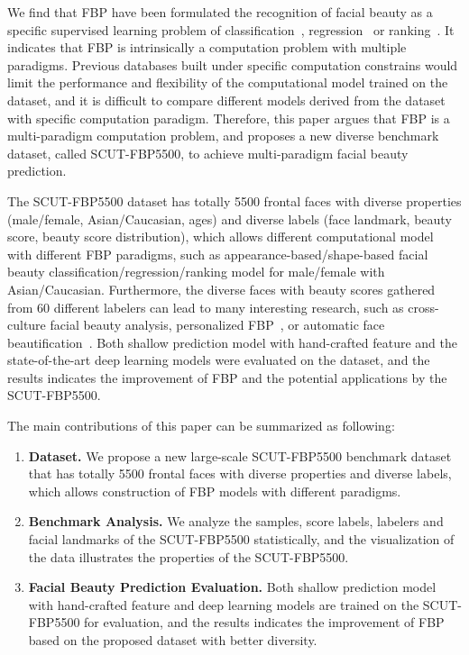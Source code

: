 \documentclass[10pt,conference,a4paper]{IEEEtran}
\begin{document}
We find that FBP have been formulated the recognition of facial beauty as a specific supervised learning problem of classification~\cite{2014chiang,2009mao,2006nc_Dror,2014wang}, regression~\cite{2006Kagian,2012nc_mu,2012fan,2014gan,16} or ranking~\cite{2014yan,2013wacv,liu2016dis}. It indicates that FBP is intrinsically a computation problem with multiple paradigms. Previous databases built under specific computation constrains would limit the performance and flexibility of the computational model trained on the dataset, and it is difficult to compare different models derived from the dataset with specific computation paradigm. Therefore, this paper argues that FBP is a multi-paradigm computation problem, and proposes a new diverse benchmark dataset, called SCUT-FBP5500, to achieve multi-paradigm facial beauty prediction.

The SCUT-FBP5500 dataset has totally 5500 frontal faces with diverse properties (male/female, Asian/Caucasian, ages) and diverse labels (face landmark, beauty score, beauty score distribution), which allows different computational model with different FBP paradigms, such as appearance-based/shape-based facial beauty classification/regression/ranking model for male/female with Asian/Caucasian. Furthermore, the diverse faces with beauty scores gathered from 60 different labelers can lead to many interesting research, such as cross-culture facial beauty analysis, personalized FBP~\cite{19}, or automatic face beautification~\cite{2017liang,2015deep,2014liang,2008sig}. Both shallow prediction model with hand-crafted feature and the state-of-the-art deep learning models were evaluated on the dataset, and the results indicates the improvement of FBP and the potential applications by the SCUT-FBP5500.

The main contributions of this paper can be summarized as following:
\begin{enumerate}
  \item \textbf{Dataset.} We propose a new large-scale SCUT-FBP5500 benchmark dataset that has totally 5500 frontal faces with diverse properties and diverse labels, which allows construction of FBP models with different paradigms.
  \item \textbf{Benchmark Analysis.} We analyze the samples, score labels, labelers and facial landmarks of the SCUT-FBP5500 statistically, and the visualization of the data illustrates the properties of the SCUT-FBP5500.
  \item \textbf{Facial Beauty Prediction Evaluation.} Both shallow prediction model with hand-crafted feature and deep learning models are trained on the SCUT-FBP5500 for evaluation, and the results indicates the improvement of FBP based on the proposed dataset with better diversity.
\end{enumerate}
\end{document}
